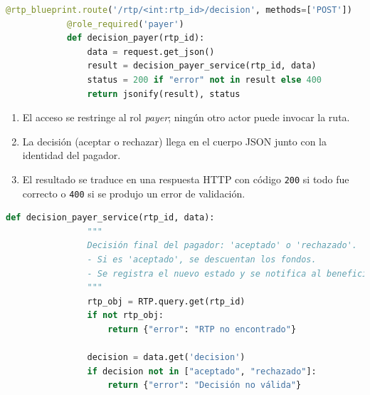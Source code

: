 \begin{itemize}
       \begin{lstlisting}[language=Python, style=custom, caption={Endpoint decisión final}]
            @rtp_blueprint.route('/rtp/<int:rtp_id>/decision', methods=['POST'])
            @role_required('payer')
            def decision_payer(rtp_id):
                data = request.get_json()
                result = decision_payer_service(rtp_id, data)
                status = 200 if "error" not in result else 400
                return jsonify(result), status
        \end{lstlisting}

        \begin{enumerate}
          \item El acceso se restringe al rol \emph{payer}; ningún otro actor
                puede invocar la ruta.  
          \item La decisión (aceptar o rechazar) llega en el cuerpo JSON
                junto con la identidad del pagador.  
          \item El resultado se traduce en una respuesta HTTP con código
                \texttt{200} si todo fue correcto o \texttt{400} si se
                produjo un error de validación.
        \end{enumerate}
        \vspace{0.8em}

       \begin{lstlisting}[language=Python, style=custom, caption={Servicio de negocio decisión final}]
            def decision_payer_service(rtp_id, data):
                """
                Decisión final del pagador: 'aceptado' o 'rechazado'.
                - Si es 'aceptado', se descuentan los fondos.
                - Se registra el nuevo estado y se notifica al beneficiario.
                """
                rtp_obj = RTP.query.get(rtp_id)
                if not rtp_obj:
                    return {"error": "RTP no encontrado"}
                
                decision = data.get('decision')
                if decision not in ["aceptado", "rechazado"]:
                    return {"error": "Decisión no válida"}


\end{lstlisting}
\end{itemize}
